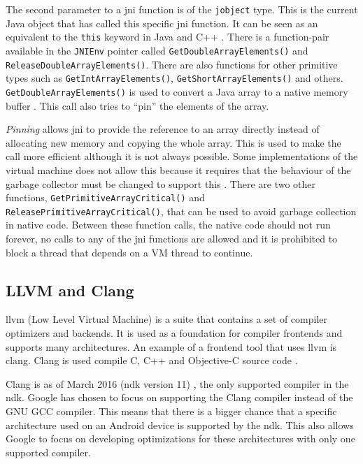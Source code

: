 The second parameter to a \gls{jni} function is of the \texttt{jobject} type. This is the current Java object that has called this specific \gls{jni} function. It can be seen as an equivalent to the \texttt{this} keyword in Java and C++ \cite[p.~23]{liang1999java}. There is a function-pair available in the \texttt{JNIEnv} pointer called \texttt{GetDoubleArrayElements()} and \texttt{ReleaseDoubleArrayElements()}. There are also functions for other primitive types such as \texttt{GetIntArrayElements()}, \texttt{GetShortArrayElements()} and others. \texttt{GetDoubleArrayElements()} is used to convert a Java array to a native memory buffer \cite[p.~159]{liang1999java}. This call also tries to \enquote{pin} the elements of the array.

\emph{Pinning} allows \gls{jni} to provide the reference to an array directly instead of allocating new memory and copying the whole array. This is used to make the call more efficient although it is not always possible. Some implementations of the virtual machine does not allow this because it requires that the behaviour of the garbage collector must be changed to support this \cite[p.~158]{liang1999java}. There are two other functions, \texttt{GetPrimitiveArrayCritical()} and \texttt{ReleasePrimitiveArrayCritical()}, that can be used to avoid garbage collection in native code. Between these function calls, the native code should not run forever, no calls to any of the \gls{jni} functions are allowed and it is prohibited to block a thread that depends on a VM thread to continue.

\subsection{LLVM and Clang}
\gls{llvm} (Low Level Virtual Machine) is a suite that contains a set of compiler optimizers and backends. It is used as a foundation for compiler frontends and supports many architectures. An example of a frontend tool that uses \gls{llvm} is \gls{clang}. Clang is used compile C, C++ and Objective-C source code \cite{clang:comp}.

Clang is as of March 2016 (\gls{ndk} version 11) \cite{android:ndk:revision}, the only supported compiler in the \gls{ndk}. Google has chosen to focus on supporting the Clang compiler instead of the GNU GCC compiler. This means that there is a bigger chance that a specific architecture used on an Android device is supported by the \gls{ndk}. This also allows Google to focus on developing optimizations for these architectures with only one supported compiler.

